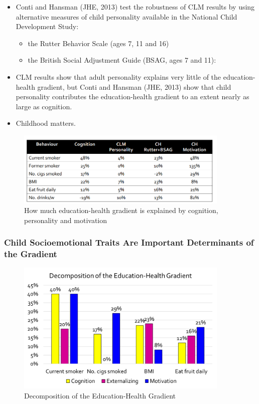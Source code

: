 \begin{enumerate}
\begin{itemize} 
        \item Conti and Hansman (JHE, 2013) test the robustness of CLM results by using alternative measures of child personality available in the National Child Development Study:
\begin{itemize}
        \item the Rutter Behavior Scale (ages 7, 11 and 16)
        \item the British Social Adjustment Guide (BSAG, ages 7 and 11):
\end{itemize}
        \item CLM results show that adult personality explains very little of the education-health gradient, but Conti and Hansman (JHE, 2013) show that child personality contributes the education-health gradient to an extent nearly as large as cognition. 
        \item Childhood matters.
\end{itemize}
\begin{figure}[H]%
                \centering
                \includegraphics[width=4in]{images/ch3/42.png}
                \caption{How much education-health gradient is explained by cognition, personality and motivation}
                \label{fig:label}
            \end{figure} 
\end{enumerate}


\subsubsection{Child Socioemotional Traits Are Important Determinants of the Gradient}
\begin{figure}[H]%
                \centering
                \includegraphics[width=4in]{images/ch3/43.png}
                \caption{Decomposition of the Education-Health Gradient}
                \label{fig:label}
            \end{figure} 

